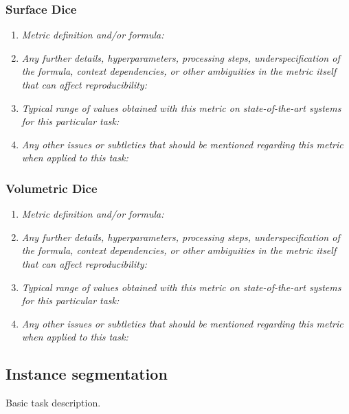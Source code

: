 \documentclass[a4paper,11pt]{article}
\begin{document}
        \subsubsection{Surface Dice}
            \begin{enumerate}[label=\alph*.]
                \item \textit{Metric definition and/or formula:}
                \bigskip
                \item \textit{Any further details, hyperparameters, processing steps, underspecification of the formula, context dependencies, or other ambiguities in the metric itself that can affect reproducibility:}
                \bigskip
                \item \textit{Typical range of values obtained with this metric on state-of-the-art systems for this particular task:}
                \bigskip
                \item \textit{Any other issues or subtleties that should be mentioned regarding this metric when applied to this task:}
                \bigskip
            \end{enumerate}
        \subsubsection{Volumetric Dice}
            \begin{enumerate}[label=\alph*.]
                \item \textit{Metric definition and/or formula:}
                \bigskip
                \item \textit{Any further details, hyperparameters, processing steps, underspecification of the formula, context dependencies, or other ambiguities in the metric itself that can affect reproducibility:}
                \bigskip
                \item \textit{Typical range of values obtained with this metric on state-of-the-art systems for this particular task:}
                \bigskip
                \item \textit{Any other issues or subtleties that should be mentioned regarding this metric when applied to this task:}
                \bigskip
            \end{enumerate}


    \subsection{Instance segmentation}
        Basic task description.
\end{document}
